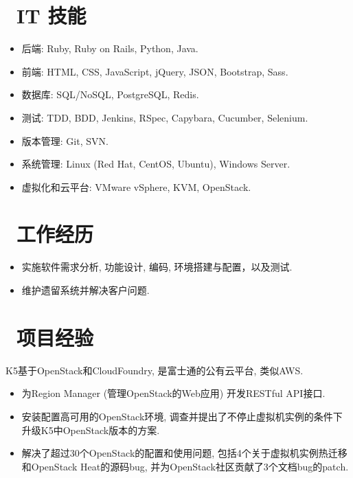 \documentclass{resume}
\begin{document}



\section{\faCogs\ IT 技能}
\begin{itemize}[parsep=0.5ex]
  \item 后端: Ruby, Ruby on Rails, Python, Java.
  \item 前端: HTML, CSS, JavaScript, jQuery, JSON, Bootstrap, Sass.
  \item 数据库: SQL/NoSQL, PostgreSQL, Redis.
  \item 测试: TDD, BDD, Jenkins, RSpec, Capybara, Cucumber, Selenium.
  \item 版本管理: Git, SVN.
  \item 系统管理: Linux (Red Hat, CentOS, Ubuntu), Windows Server.
  \item 虚拟化和云平台: VMware vSphere, KVM, OpenStack.
\end{itemize}

\section{\faUsers\ 工作经历}
\begin{itemize}
  \item 实施软件需求分析, 功能设计, 编码, 环境搭建与配置，以及测试.
  \item 维护遗留系统并解决客户问题.
\end{itemize}

\section{\faTasks\ 项目经验}
\begin{onehalfspacing}
K5基于OpenStack和CloudFoundry, 是富士通的公有云平台, 类似AWS.
\begin{itemize}
  \item 为Region Manager (管理OpenStack的Web应用) 开发RESTful API接口.
  \item 安装配置高可用的OpenStack环境, 调查并提出了不停止虚拟机实例的条件下升级K5中OpenStack版本的方案.
  \item 解决了超过30个OpenStack的配置和使用问题, 包括4个关于虚拟机实例热迁移和OpenStack Heat的源码bug, 并为OpenStack社区贡献了3个文档bug的patch.
\end{itemize}
\end{onehalfspacing}
\end{document}
